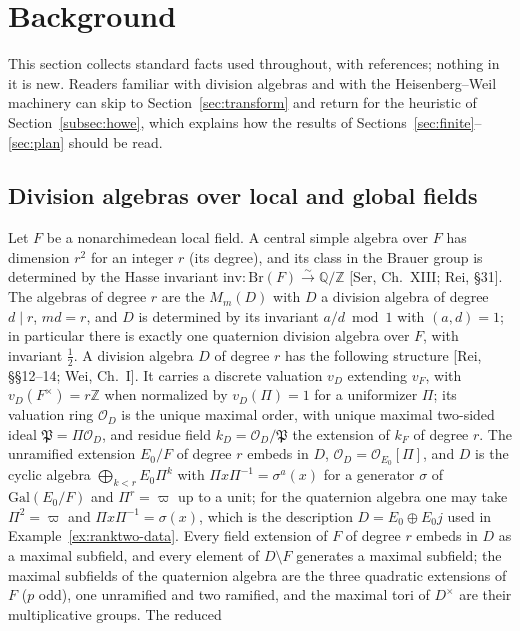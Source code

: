 \documentclass[11pt]{article}
\newcommand{\Z}{\mathbb Z}
\newcommand{\Q}{\mathbb Q}
\newcommand{\Ocal}{\mathcal O}
\newcommand{\Pfr}{\mathfrak P}
\theoremstyle{plain}
\theoremstyle{definition}
\begin{document}
\section{Background}\label{sec:background}
This section collects standard facts used throughout, with references;
nothing in it is new.  Readers familiar with division algebras and with
the Heisenberg--Weil machinery can skip to Section~\ref{sec:transform}
and return for the heuristic of Section~\ref{subsec:howe}, which explains
how the results of Sections~\ref{sec:finite}--\ref{sec:plan} should be
read.

\subsection{Division algebras over local and global fields}\label{subsec:divalg}
Let $F$ be a nonarchimedean local field.  A central simple algebra over
$F$ has dimension $r^2$ for an integer $r$ (its degree), and its class in
the Brauer group is determined by the Hasse invariant
$\mathrm{inv}:\mathrm{Br}(F)\xrightarrow{\sim}\Q/\Z$ [Ser, Ch.~XIII; Rei,
\S31].  The algebras of degree $r$ are the $M_m(D)$ with $D$ a division
algebra of degree $d\mid r$, $md=r$, and $D$ is determined by its
invariant $a/d\bmod1$ with $(a,d)=1$; in particular there is exactly one
quaternion division algebra over $F$, with invariant $\tfrac12$.  A
division algebra $D$ of degree $r$ has the following structure
[Rei, \S\S12--14; Wei, Ch.~I].  It carries a discrete valuation $v_D$
extending $v_F$, with $v_D(F^\times)=r\Z$ when normalized by
$v_D(\Pi)=1$ for a uniformizer $\Pi$; its valuation ring $\Ocal_D$ is the
unique maximal order, with unique maximal two-sided ideal
$\Pfr=\Pi\Ocal_D$, and residue field $k_D=\Ocal_D/\Pfr$ the extension of
$k_F$ of degree $r$.  The unramified extension $E_0/F$ of degree $r$
embeds in $D$, $\Ocal_D=\Ocal_{E_0}[\Pi]$, and $D$ is the cyclic algebra
$\bigoplus_{k<r}E_0\Pi^k$ with $\Pi x\Pi^{-1}=\sigma^a(x)$ for a
generator $\sigma$ of $\mathrm{Gal}(E_0/F)$ and $\Pi^r=\varpi$ up to a
unit; for the quaternion algebra one may take $\Pi^2=\varpi$ and
$\Pi x\Pi^{-1}=\sigma(x)$, which is the description
$D=E_0\oplus E_0j$ used in Example~\ref{ex:ranktwo-data}.  Every field
extension of $F$ of degree $r$ embeds in $D$ as a maximal subfield, and
every element of $D\setminus F$ generates a maximal subfield; the
maximal subfields of the quaternion algebra are the three quadratic
extensions of $F$ ($p$ odd), one unramified and two ramified, and the
maximal tori of $D^\times$ are their multiplicative groups.  The reduced
\end{document}
